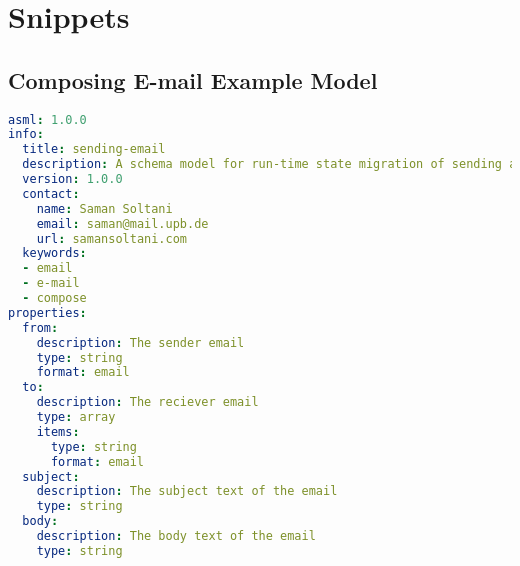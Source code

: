 \chapter{Snippets} 

\label{appendix:compose-email-schema}
\section{Composing E-mail Example Model}
\lstset{
  label=lis:sending-email-schema, caption=Composing E-mail model as JSON Schema in YAML., 
  basicstyle=\ttfamily\footnotesize, frame=single, captionpos=b,
  xleftmargin=.01\textwidth, xrightmargin=.01\textwidth,
  breaklines=true
}
\begin{lstlisting}[language=yaml]
asml: 1.0.0
info:
  title: sending-email
  description: A schema model for run-time state migration of sending an email
  version: 1.0.0
  contact:
    name: Saman Soltani
    email: saman@mail.upb.de
    url: samansoltani.com
  keywords:
  - email
  - e-mail
  - compose    
properties:
  from:
    description: The sender email
    type: string
    format: email
  to:
    description: The reciever email
    type: array
    items:
      type: string
      format: email
  subject:
    description: The subject text of the email
    type: string
  body:
    description: The body text of the email
    type: string
\end{lstlisting}


